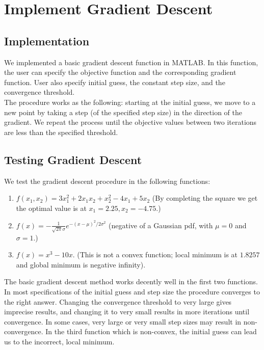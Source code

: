 
\section{Implement Gradient Descent}\label{sec:grad_desc}

\subsection{Implementation}
We implemented a basic gradient descent function in MATLAB. In this function, the user can specify the objective function and the corresponding gradient function. User also specify initial guess, the constant step size, and the convergence threshold. \\
The procedure works as the following: starting at the initial guess, we move to a new point by taking a step (of the specified step size) in the direction of the gradient. We repeat the process until the objective values between two iterations are less than the specified threshold.

\subsection{Testing Gradient Descent}
We test the gradient descent procedure in the following functions:
\begin{enumerate}
\item $f(x_1, x_2) = 3x_1^2 + 2x_1x_2 + x_2^2 - 4x_1 + 5x_2$ (By completing the square we get the optimal value is at $x_1 = 2.25, x_2 = -4.75$.)
\item $f(x) = -\frac{1}{\sqrt{2\pi}\sigma}e^{-(x-\mu)^2/2\sigma^2}$ (negative of a Gaussian pdf, with $\mu = 0$ and $\sigma = 1$.)
\item $f(x) = x^3 - 10x$. (This is not a convex function; local minimum is at $1.8257$ and global minimum is negative infinity).
\end{enumerate}

The basic gradient descent method works decently well in the first two functions. In most specifications of the initial guess and step size the procedure converges to the right answer. Changing the convergence threshold to very large gives imprecise results, and changing it to very small results in more iterations until convergence. In some cases, very large or very small step sizes may result in non-convergence. In the third function which is non-convex, the initial guess can lead us to the incorrect, local minimum.  

